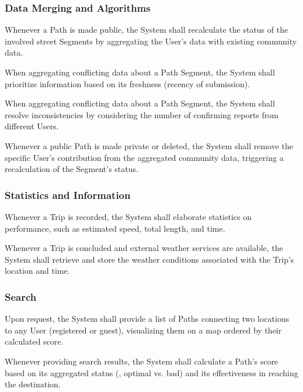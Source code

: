\subsubsection*{Data Merging and Algorithms}
\begin{rlist}[resume]
    \item Whenever a Path is made public, the System shall recalculate the status of the involved street Segments by aggregating the User's data with existing community data.
    \item When aggregating conflicting data about a Path Segment, the System shall prioritize information based on its freshness (recency of submission).
    \item When aggregating conflicting data about a Path Segment, the System shall resolve inconsistencies by considering the number of confirming reports from different Users.
    \item Whenever a public Path is made private or deleted, the System shall remove the specific User's contribution from the aggregated community data, triggering a recalculation of the Segment's status.
\end{rlist}

\subsubsection*{Statistics and Information}
\begin{rlist}[resume]
    \item Whenever a Trip is recorded, the System shall elaborate statistics on performance, such as estimated speed, total length, and time.
    \item Whenever a Trip is concluded and external weather services are available, the System shall retrieve and store the weather conditions associated with the Trip's location and time.
\end{rlist}

\subsubsection*{Search}
\begin{rlist}[resume]
    \item Upon request, the System shall provide a list of Paths connecting two locations to any User (registered or guest), visualizing them on a map ordered by their calculated score.
    \item Whenever providing search results, the System shall calculate a Path's score based on its aggregated status (\eg, optimal vs. bad) and its effectiveness in reaching the destination.
\end{rlist}

